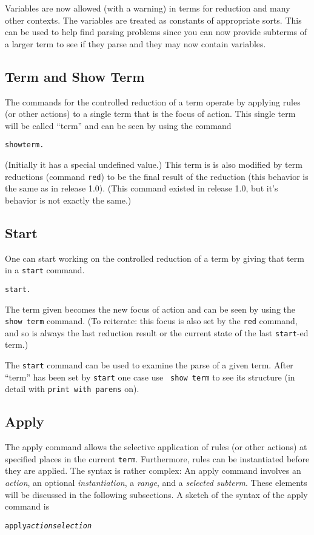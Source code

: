 Variables are now allowed (with a warning) in terms for reduction and
many other contexts.  The variables are treated as constants of
appropriate sorts.  This can be used to help find parsing problems
since you can now provide subterms of a larger term to see if they
parse and they may now contain variables.

\subsection{Term and Show Term}
The commands for the controlled reduction of a term operate by
applying rules (or other actions) to a single term that is the focus
of action.  This single term will be called ``term'' and can be seen
by using the command
\begin{alltt}
        show term .
\end{alltt}
(Initially it has a special undefined value.)  This term is is also
modified by term reductions (command {\tt red}) to be the final result
of the reduction (this behavior is the same as in release 1.0).  (This
command existed in release 1.0, but it's behavior is not exactly the
same.)

\subsection{Start}
\label{start}
One can start working on the controlled reduction of a term by giving
that term in a {\tt start} command.
\begin{alltt}
        start  .
\end{alltt}
The term given becomes the new focus of action and can be seen by
using the {\tt show term} command.  (To reiterate: this focus is also
set by the {\tt red} command, and so is always the last reduction
result or the current state of the last {\tt start}-ed term.)

The {\tt start} command can be used to examine the parse of a given
term.  After ``term'' has been set by {\tt start} one case use {\tt
  show term} to see its structure (in detail with {\tt print with
  parens} on).

\subsection{Apply} \label{Apply}
The apply command allows the selective application of rules (or other
actions) at specified places in the current {\tt term}.  Furthermore,
rules can be instantiated before they are applied.  The syntax is
rather complex: An apply command involves an {\em action}, an optional
{\em instantiation}, a {\em range}, and a {\em selected subterm}.
These elements will be discussed in the following subsections.  A
sketch of the syntax of the apply command is
\begin{alltt}
        apply {\em action}   {\em selection}
\end{alltt}

